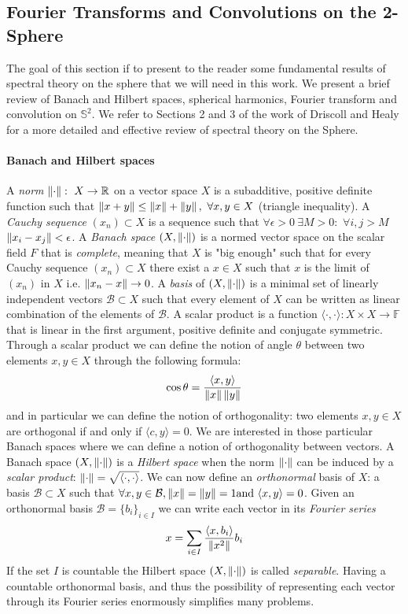 \subsection{Fourier Transforms and Convolutions on the 2-Sphere}\label{sec:Fourier on the Sphere}
The goal of this section if to present to the reader some fundamental results of spectral theory on the sphere that we will need in this work. We present a brief review of Banach and Hilbert spaces, spherical harmonics, Fourier transform and convolution on $\mathbb S^2$. We refer to Sections 2 and 3 of the work of Driscoll and Healy \cite{Driscoll:1994:CFT:184069.184073} for a more detailed and effective review of spectral theory on the Sphere.

\paragraph{Banach and Hilbert spaces}
A \textit{norm} $\left\lVert\cdot\right\rVert:\ X\to\mathbb R$ on a vector space $X$ is a subadditive, positive definite function such that $\left\lVert x+y\right\rVert\leq\left\lVert x\right\rVert +\left\lVert y\right\rVert,\ \forall x,y\in X$ (triangle inequality). A \textit{Cauchy sequence} $(x_n)\subset X$ is a sequence such that $\forall \epsilon>0\  \exists M>0: $ $\forall i,j>M$ $ \left\lVert x_i-x_j\right\rVert<\epsilon$. A \textit{Banach space} $(X, \left\lVert\cdot\right\rVert)$ is a normed vector space on the scalar field $F$ that is \textit{complete}, meaning that $X$ is "big enough" such that for every Cauchy sequence $(x_n)\subset X$ there exist a $x\in X$ such that $x$ is the limit of $(x_n)$ in $X$ i.e. $\left\lVert x_n-x\right\rVert\rightarrow 0$. A \textit{basis} of $(X, \left\lVert\cdot\right\rVert)$ is a minimal set of linearly independent vectors $\mathcal B \subset X$ such that every element of $X$ can be written as linear combination of the elements of $\mathcal B$. A scalar product is a function $\langle\cdot,\cdot\rangle: X\times X \rightarrow \mathbb F$ that is linear in the first argument, positive definite and conjugate symmetric. Through a scalar product we can define the notion of angle $\theta$ between two elements $x, y \in X$ through the following formula: 
$$
\cos \theta = \frac{\langle x, y\rangle}{\left\lVert x\right\rVert \left\lVert y\right\rVert}
$$ 
and in particular we can define the notion of orthogonality: two elements  $x, y \in X$ are orthogonal if and only if $\langle c, y\rangle=0$. We are interested in those particular Banach spaces where we can define a notion of orthogonality between vectors. A Banach space $(X, \left\lVert\cdot\right\rVert )$ is a \textit{Hilbert space} when the norm $ \left\lVert\cdot\right\rVert $ can be induced by a \textit{scalar product}: $\left\lVert\cdot\right\rVert = \sqrt{\langle\cdot,\cdot\rangle}$. We can now define an \textit{orthonormal} basis of $X$: a basis $\mathcal B \subset X$ such that $\forall x, y \in \mathcal B, \left\lVert x\right\rVert = \left\lVert y\right\rVert = 1 \text{and } \langle x, y\rangle = 0$. Given an orthonormal basis $\mathcal B = \{b_i\}_{i\in I}$ we can write each vector in its \textit{Fourier series} 
\begin{equation}\label{eq:abstract fourier}
x = \sum_{i\in I} \frac{\langle x, b_i\rangle}{\left\lVert x^2\right\rVert}b_i
\end{equation}
If the set $I$ is countable the Hilbert space $(X, \left\lVert\cdot\right\rVert)$ is called \textit{separable}. Having a countable orthonormal basis, and thus the possibility of representing each vector through its Fourier series enormously simplifies many problems.
